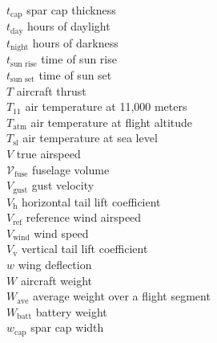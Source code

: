 \begin{multicols}{2}
\begin{tabbing}
$t_{\text{cap}}$ \> spar cap thickness \\ %
$t_{\text{day}}$ \> hours of daylight \\ %
$t_{\text{night}}$ \> hours of darkness \\ %
$t_{\text{sun rise}}$ \> time of sun rise \\ %
$t_{\text{sun set}}$ \> time of sun set \\ %
$T$ \> aircraft thrust \\ %
$T_{11}$ \> air temperature at 11,000 meters \\ %
$T_{\text{atm}}$ \> air temperature at flight altitude \\ %
$T_{\text{sl}}$ \> air temperature at sea level \\ %
$V$ \> true airspeed \\ %
$\mathcal{V}_{\text{fuse}}$ \>  fuselage volume \\ %
$V_{\text{gust}}$ \>  gust velocity \\ %
$V_{\text{h}}$ \> horizontal tail lift coefficient \\
$V_{\text{ref}}$ \>  reference wind airspeed \\ %
$V_{\text{wind}}$ \>  wind speed \\ %
$V_{\text{v}}$ \> vertical tail lift coefficient \\
$w$ \> wing deflection \\ %
$W$ \> aircraft weight \\ %
$W_{\text{ave}}$ \> average weight over a flight segment \\ %
$W_{\text{batt}}$ \> battery weight \\ %
$w_{\text{cap}}$ \> spar cap width \\ %

\end{tabbing}
\end{multicols}
